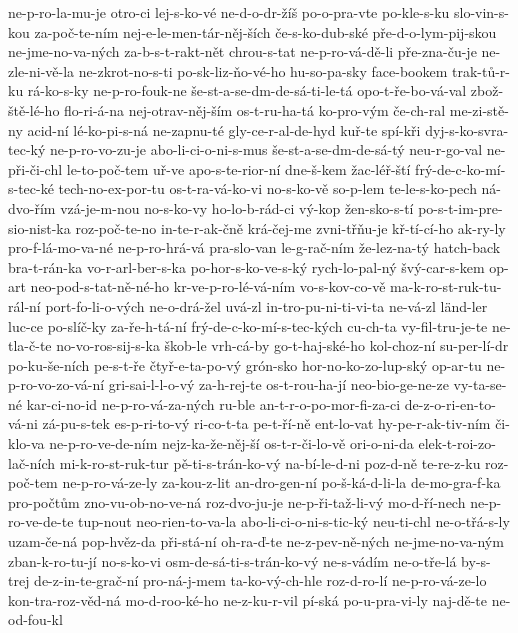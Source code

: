 {ne-p-ro-la-mu-je
otro-ci
lej-s-ko-vé
ne-d-o-dr-žíš
po-o-pra-vte
po-kle-s-ku
slo-vin-s-kou
za-poč-te-ním
nej-e-le-men-tár-něj-ších
če-s-ko-dub-ské
pře-d-o-lym-pij-skou
ne-jme-no-va-ných
za-b-s-t-rakt-nět
chrou-s-tat
ne-p-ro-vá-dě-li
pře-zna-ču-je
ne-zle-ni-vě-la
ne-zkrot-no-s-ti
po-sk-liz-ňo-vé-ho
hu-so-pa-sky
face-bookem
trak-tů-r-ku
rá-ko-s-ky
ne-p-ro-fouk-ne
še-st-a-se-dm-de-sá-ti-le-tá
opo-t-ře-bo-vá-val
zbož-ště-lé-ho
flo-ri-á-na
nej-otrav-něj-ším
os-t-ru-ha-tá
ko-pro-vým
če-ch-ral
me-zi-stě-ny
acid-ní
lé-ko-pi-s-ná
ne-zapnu-té
gly-ce-r-al-de-hyd
kuř-te
spí-kři
dyj-s-ko-svra-tec-ký
ne-p-ro-vo-zu-je
abo-li-ci-o-ni-s-mus
še-st-a-se-dm-de-sá-tý
neu-r-go-val
ne-při-či-chl
le-to-poč-tem
uř-ve
apo-s-te-rior-ní
dne-š-kem
žac-léř-ští
frý-de-c-ko-mí-s-tec-ké
tech-no-ex-por-tu
os-t-ra-vá-ko-vi
no-s-ko-vě
so-p-lem
te-le-s-ko-pech
ná-dvo-řím
vzá-je-m-nou
no-s-ko-vy
ho-lo-b-rád-ci
vý-kop
žen-sko-s-tí
po-s-t-im-pre-sio-nist-ka
roz-poč-te-no
in-te-r-ak-čně
krá-čej-me
zvni-třňu-je
kř-tí-cí-ho
ak-ry-ly
pro-f-lá-mo-va-né
ne-p-ro-hrá-vá
pra-slo-van
le-g-rač-ním
že-lez-na-tý
hatch-back
bra-t-rán-ka
vo-r-arl-ber-s-ka
po-hor-s-ko-ve-s-ký
rych-lo-pal-ný
švý-car-s-kem
op-art
neo-pod-s-tat-ně-né-ho
kr-ve-p-ro-lé-vá-ním
vo-s-kov-co-vě
ma-k-ro-st-ruk-tu-rál-ní
port-fo-li-o-vých
ne-o-drá-žel
uvá-zl
in-tro-pu-ni-ti-vi-ta
ne-vá-zl
länd-ler
luc-ce
po-slíč-ky
za-ře-h-tá-ní
frý-de-c-ko-mí-s-tec-kých
cu-ch-ta
vy-fil-tru-je-te
ne-tla-č-te
no-vo-ros-sij-s-ka
škob-le
vrh-cá-by
go-t-haj-ské-ho
kol-choz-ní
su-per-lí-dr
po-ku-še-ních
pe-s-t-ře
čtyř-e-ta-po-vý
grón-sko
hor-no-ko-zo-lup-ský
op-ar-tu
ne-p-ro-vo-zo-vá-ní
gri-sai-l-l-o-vý
za-h-rej-te
os-t-rou-ha-jí
neo-bio-ge-ne-ze
vy-ta-se-né
kar-ci-no-id
ne-p-ro-vá-za-ných
ru-ble
an-t-r-o-po-mor-fi-za-ci
de-z-o-ri-en-to-vá-ni
zá-pu-s-tek
es-p-ri-to-vý
ri-co-t-ta
pe-t-ří-ně
ent-lo-vat
hy-pe-r-ak-tiv-ním
či-klo-va
ne-p-ro-ve-de-ním
nejz-ka-že-něj-ší
os-t-r-či-lo-vě
ori-o-ni-da
elek-t-roi-zo-lač-ních
mi-k-ro-st-ruk-tur
pě-ti-s-trán-ko-vý
na-bí-le-d-ni
poz-d-ně
te-re-z-ku
roz-poč-tem
ne-p-ro-vá-ze-ly
za-kou-z-lit
an-dro-gen-ní
po-š-ká-d-li-la
de-mo-gra-f-ka
pro-počtům
zno-vu-ob-no-ve-ná
roz-dvo-ju-je
ne-p-ři-taž-li-vý
mo-d-ří-nech
ne-p-ro-ve-de-te
tup-nout
neo-rien-to-va-la
abo-li-ci-o-ni-s-tic-ký
neu-ti-chl
ne-o-třá-s-ly
uzam-če-ná
pop-hvěz-da
při-stá-ní
oh-ra-ď-te
ne-z-pev-ně-ných
ne-jme-no-va-ným
zban-k-ro-tu-jí
no-s-ko-vi
osm-de-sá-ti-s-trán-ko-vý
ne-s-vádím
ne-o-tře-lá
by-s-trej
de-z-in-te-grač-ní
pro-ná-j-mem
ta-ko-vý-ch-hle
roz-d-ro-lí
ne-p-ro-vá-ze-lo
kon-tra-roz-věd-ná
mo-d-roo-ké-ho
ne-z-ku-r-vil
pí-ská
po-u-pra-vi-ly
naj-dě-te
ne-od-fou-kl
}
